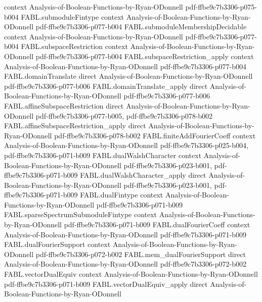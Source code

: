 \begin{theorem}
  {context}
  {Analysis-of-Boolean-Functions-by-Ryan-ODonnell}
  {pdf-ffbe9c7b3306-p075-b004}
\proofstep
  {FABL.submoduleFintype}
  {context}
  {Analysis-of-Boolean-Functions-by-Ryan-ODonnell}
  {pdf-ffbe9c7b3306-p077-b004}
\proofstep
  {FABL.submoduleMembershipDecidable}
  {context}
  {Analysis-of-Boolean-Functions-by-Ryan-ODonnell}
  {pdf-ffbe9c7b3306-p077-b004}
\proofstep
  {FABL.subspaceRestriction}
  {context}
  {Analysis-of-Boolean-Functions-by-Ryan-ODonnell}
  {pdf-ffbe9c7b3306-p077-b004}
\proofstep
  {FABL.subspaceRestriction_apply}
  {context}
  {Analysis-of-Boolean-Functions-by-Ryan-ODonnell}
  {pdf-ffbe9c7b3306-p077-b004}
\proofstep
  {FABL.domainTranslate}
  {direct}
  {Analysis-of-Boolean-Functions-by-Ryan-ODonnell}
  {pdf-ffbe9c7b3306-p077-b006}
\proofstep
  {FABL.domainTranslate_apply}
  {direct}
  {Analysis-of-Boolean-Functions-by-Ryan-ODonnell}
  {pdf-ffbe9c7b3306-p077-b006}
\proofstep
  {FABL.affineSubspaceRestriction}
  {direct}
  {Analysis-of-Boolean-Functions-by-Ryan-ODonnell}
  {pdf-ffbe9c7b3306-p077-b005,
    pdf-ffbe9c7b3306-p078-b002}
\proofstep
  {FABL.affineSubspaceRestriction_apply}
  {direct}
  {Analysis-of-Boolean-Functions-by-Ryan-ODonnell}
  {pdf-ffbe9c7b3306-p078-b002}
\proofstep
  {FABL.finiteAddFourierCoeff}
  {context}
  {Analysis-of-Boolean-Functions-by-Ryan-ODonnell}
  {pdf-ffbe9c7b3306-p025-b004,
    pdf-ffbe9c7b3306-p071-b009}
\proofstep
  {FABL.dualWalshCharacter}
  {context}
  {Analysis-of-Boolean-Functions-by-Ryan-ODonnell}
  {pdf-ffbe9c7b3306-p023-b001,
    pdf-ffbe9c7b3306-p071-b009}
\proofstep
  {FABL.dualWalshCharacter_apply}
  {direct}
  {Analysis-of-Boolean-Functions-by-Ryan-ODonnell}
  {pdf-ffbe9c7b3306-p023-b001,
    pdf-ffbe9c7b3306-p071-b009}
\proofstep
  {FABL.dualFintype}
  {context}
  {Analysis-of-Boolean-Functions-by-Ryan-ODonnell}
  {pdf-ffbe9c7b3306-p071-b009}
\proofstep
  {FABL.sparseSpectrumSubmoduleFintype}
  {context}
  {Analysis-of-Boolean-Functions-by-Ryan-ODonnell}
  {pdf-ffbe9c7b3306-p071-b009}
\proofstep
  {FABL.dualFourierCoeff}
  {context}
  {Analysis-of-Boolean-Functions-by-Ryan-ODonnell}
  {pdf-ffbe9c7b3306-p071-b009}
\proofstep
  {FABL.dualFourierSupport}
  {context}
  {Analysis-of-Boolean-Functions-by-Ryan-ODonnell}
  {pdf-ffbe9c7b3306-p072-b002}
\proofstep
  {FABL.mem_dualFourierSupport}
  {direct}
  {Analysis-of-Boolean-Functions-by-Ryan-ODonnell}
  {pdf-ffbe9c7b3306-p072-b002}
\proofstep
  {FABL.vectorDualEquiv}
  {context}
  {Analysis-of-Boolean-Functions-by-Ryan-ODonnell}
  {pdf-ffbe9c7b3306-p071-b009}
\proofstep
  {FABL.vectorDualEquiv_apply}
  {direct}
  {Analysis-of-Boolean-Functions-by-Ryan-ODonnell}

\end{theorem}
